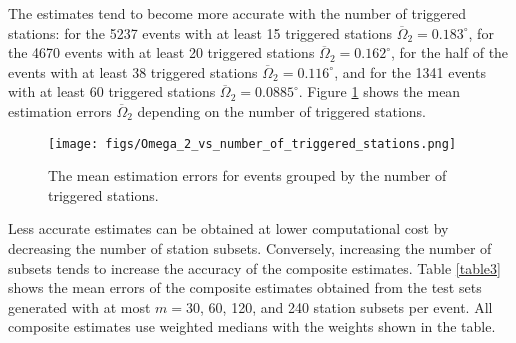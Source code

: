 \documentclass[reprint,
superscriptaddress,
amsmath,amssymb,aps,showkeys,showpacs,
twoside,final,secnumarabic,%
nofootinbib]{revtex4-2}
\begin{document}
The estimates tend to become more accurate with the number of triggered stations: for the 5237 events with at least 15 triggered stations $\overline{\Omega}_2 = 0.183^\circ$, for the 4670 events with at least 20 triggered stations $\overline{\Omega}_2 = 0.162^\circ$, for the half of the events with at least 38 triggered stations $\overline{\Omega}_2 = 0.116^\circ$, and for the 1341 events with at least 60 triggered stations $\overline{\Omega}_2 = 0.0885^\circ$.
Figure \ref{fig_Omegas2_vs_n_stations} shows the mean estimation errors $\overline{\Omega}_2$ depending on the number of triggered stations.

\begin{figure}[h]
\texttt{[image: figs/Omega\_2\_vs\_number\_of\_triggered\_stations.png]}
\caption{\label{fig_Omegas2_vs_n_stations} The mean estimation errors for events grouped by the number of triggered stations.}
\end{figure}




Less accurate estimates can be obtained at lower computational cost by decreasing the number of station subsets. Conversely, increasing the number of subsets tends to increase the accuracy of the composite estimates. Table \ref{table3} shows the mean errors of the composite estimates obtained from the test sets generated with at most $m=30$, 60, 120, and 240 station subsets per event. All composite estimates use weighted medians with the weights shown in the table.
\end{document}
